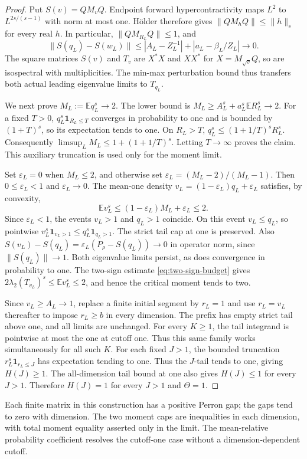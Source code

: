\documentclass[11pt]{article}
\begin{document}
\begin{proof}
Put $S(v)=QM_vQ$. Endpoint forward hypercontractivity maps $L^2$
to $L^{2s/(s-1)}$ with norm at most one. H\"older therefore gives
$\|QM_hQ\|\le\|h\|_s$ for every real $h$. In particular,
$\|QM_{R_L}Q\|\le1$, and
\[
 \|S(q_L)-S(w_L)\|
 \le |A_L-Z_L^{-1}|+|a_L-\beta_L/Z_L|\longrightarrow0.
\]
The square matrices $S(v)$ and $T_v$ are $X^*X$ and $XX^*$ for
$X=M_{\sqrt v}Q$, so are isospectral with multiplicities. The
min-max perturbation bound thus transfers both actual leading
eigenvalue limits to $T_{q_L}$.

We next prove $M_L:=\mathbb E q_L^s\to2$. The lower bound is
$M_L\ge A_L^s+a_L^s\mathbb E R_L^s\to2$. For a fixed $T>0$,
$q_L^s\mathbf1_{R_L\le T}$ converges in probability to one and is
bounded by $(1+T)^s$, so its expectation tends to one. On $R_L>T$,
$q_L^s\le(1+1/T)^sR_L^s$. Consequently
$\limsup_L M_L\le1+(1+1/T)^s$. Letting $T\to\infty$ proves the
claim. This auxiliary truncation is used only for the moment limit.

Set $\varepsilon_L=0$ when $M_L\le2$, and otherwise set
$\varepsilon_L=(M_L-2)/(M_L-1)$. Then $0\le\varepsilon_L<1$ and
$\varepsilon_L\to0$. The mean-one density
$v_L=(1-\varepsilon_L)q_L+\varepsilon_L$ satisfies, by convexity,
\[
 \mathbb E v_L^s\le(1-\varepsilon_L)M_L+\varepsilon_L\le2.
\]
Since $\varepsilon_L<1$, the events $v_L>1$ and $q_L>1$ coincide.
On this event $v_L\le q_L$, so pointwise
$v_L^s\mathbf1_{v_L>1}\le q_L^s\mathbf1_{q_L>1}$. The strict
tail cap at one is preserved. Also
$S(v_L)-S(q_L)=\varepsilon_L(P_\rho-S(q_L))\to0$ in operator norm,
since $\|S(q_L)\|\to1$. Both eigenvalue limits persist, as does
convergence in probability to one. The two-sign estimate
\eqref{eq:two-sign-budget} gives
$2\lambda_2(T_{v_L})^s\le\mathbb E v_L^s\le2$, and hence the
critical moment tends to two.

Since $v_L\ge A_L\to1$, replace a finite initial segment by $r_L=1$
and use $r_L=v_L$ thereafter to impose $r_L\ge b$ in every dimension.
The prefix has empty strict tail above one, and all limits are unchanged.
For every $K\ge1$, the tail integrand is pointwise at most the one
at cutoff one. Thus this same family works simultaneously for all such $K$.
For each fixed $J>1$, the bounded truncation
$r_L^s\mathbf1_{r_L\le J}$ has expectation tending to one. Thus the
$J$-tail tends to one, giving $H(J)\ge1$. The
all-dimension tail bound at one also gives $H(J)\le1$ for every $J>1$.
Therefore $H(J)=1$ for every $J>1$ and $\Theta=1$.
\end{proof}

Each finite matrix in this construction has a positive Perron gap;
the gaps tend to zero with dimension. The two moment caps are
inequalities in each dimension, with total moment equality asserted
only in the limit. The mean-relative probability coefficient resolves
the cutoff-one case without a dimension-dependent cutoff.
\end{document}
